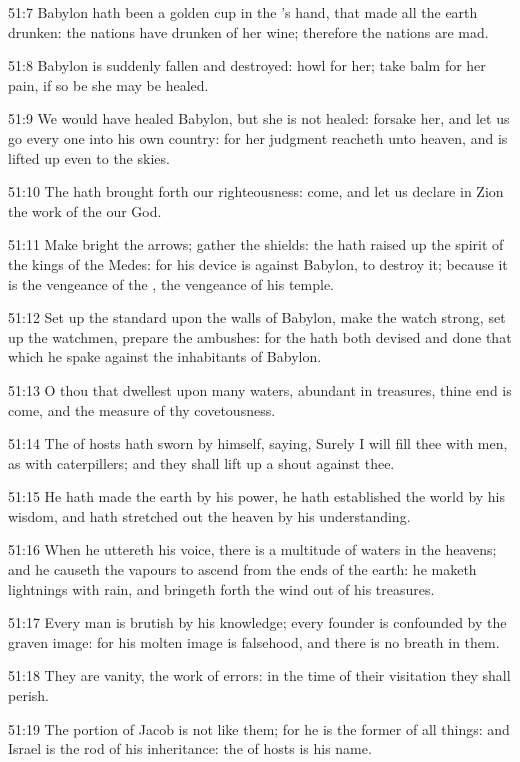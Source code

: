 51:7 Babylon hath been a golden cup in the \LORD's hand, that made all the earth drunken: the nations have drunken of her wine; therefore the nations are mad.

51:8 Babylon is suddenly fallen and destroyed: howl for her; take balm for her pain, if so be she may be healed.

51:9 We would have healed Babylon, but she is not healed: forsake her, and let us go every one into his own country: for her judgment reacheth unto heaven, and is lifted up even to the skies.

51:10 The \LORD hath brought forth our righteousness: come, and let us declare in Zion the work of the \LORD our God.

51:11 Make bright the arrows; gather the shields: the \LORD hath raised up the spirit of the kings of the Medes: for his device is against Babylon, to destroy it; because it is the vengeance of the \LORD, the vengeance of his temple.

51:12 Set up the standard upon the walls of Babylon, make the watch strong, set up the watchmen, prepare the ambushes: for the \LORD hath both devised and done that which he spake against the inhabitants of Babylon.

51:13 O thou that dwellest upon many waters, abundant in treasures, thine end is come, and the measure of thy covetousness.

51:14 The \LORD of hosts hath sworn by himself, saying, Surely I will fill thee with men, as with caterpillers; and they shall lift up a shout against thee.

51:15 He hath made the earth by his power, he hath established the world by his wisdom, and hath stretched out the heaven by his understanding.

51:16 When he uttereth his voice, there is a multitude of waters in the heavens; and he causeth the vapours to ascend from the ends of the earth: he maketh lightnings with rain, and bringeth forth the wind out of his treasures.

51:17 Every man is brutish by his knowledge; every founder is confounded by the graven image: for his molten image is falsehood, and there is no breath in them.

51:18 They are vanity, the work of errors: in the time of their visitation they shall perish.

51:19 The portion of Jacob is not like them; for he is the former of all things: and Israel is the rod of his inheritance: the \LORD of hosts is his name.

